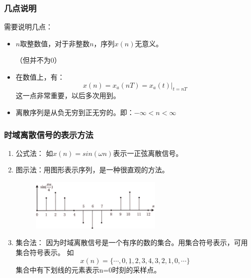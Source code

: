 \documentclass[notheorems,compress,mathserif,table]{beamer}
\begin{document}
\begin{frame}[shrink]\frametitle{几点说明}%
需要说明几点：

\begin{itemize}
  \item $n$取整数值，对于非整数$n$，序列$x(n)$无意义。\par （但并不为0）
  \item 在数值上，有：$$x(n)=x_{a}(nT)=x_{a}(t)|_{t=nT}$$
        这一点非常重要，以后多次用到。
  \item 离散序列是从负无穷到正无穷的。即：$-\infty<n<\infty$
\end{itemize}
\end{frame}
%
%
%
%
%
%
\begin{frame}[shrink]\frametitle{时域离散信号的表示方法}%
\begin{enumerate}
  \item 公式法： 如$x(n)=sin(\omega n)$表示一正弦离散信号。
  \item 图示法：用图形表示序列，是一种很直观的方法。
        \begin{figure}[h]
          \centering
          \includegraphics[width=0.6\textwidth]{zhengxianxulie.jpg}\\
        \end{figure}
  \item 集合法：
        因为时域离散信号是一个有序的数的集合。用集合符号表示，可用集合符号表示。
        如$$x(n) = \{\cdots,0,\underline{1},2,3,4,3,2,1,0,\cdots\}$$
        集合中有下划线的元素表示n=0时刻的采样点。
\end{enumerate}
\end{frame}
\end{document}
